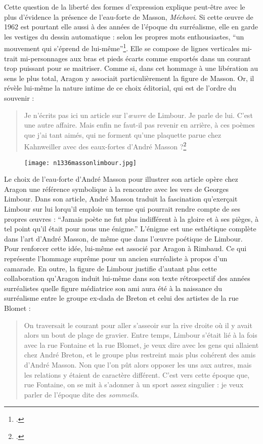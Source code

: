 	Cette question de la liberté des formes d’expression explique peut-être avec le plus d’évidence la présence de l’eau-forte de Masson, \emph{Méchovi}. Si cette \oe{}uvre de 1962 est pourtant elle aussi à des années de l’époque du surréalisme, elle en garde les vestiges du dessin automatique : selon les propres mots enthousiastes, \enquote{un mouvement qui s’éprend de lui-même}\footcite[p21]{rebelle}. Elle se compose de lignes verticales mi-trait mi-personnages aux bras et pieds écarts comme emportés dans un courant trop puissant pour se maitriser. Comme si, dans cet hommage à une libération au sens le plus total, Aragon y associait particulièrement la figure de Masson. Or, il révèle lui-même la nature intime de ce choix éditorial, qui est de l’ordre du souvenir :
\begin{quote}
Je n’écrits pas ici un article sur l’\emph{\oe{}uvre} de Limbour. Je parle de lui. C’est une autre affaire. Mais enfin ne faut-il pas revenir en arrière, à ces poèmes que j’ai tant aimés, qui ne forment qu’une plaquette parue chez Kahnweiller avec des eaux-fortes d’André Masson ?\footcite{journallimbour}\end{quote}

\begin{figure}[H]
   \centering
   \texttt{[image: n1336massonlimbour.jpg]}
	\caption{\cite{journallimbour}}\label{fig:Méchovi}
\end{figure}

	Le choix de l’eau-forte d’André Masson pour illustrer son article opère chez Aragon une référence symbolique à la rencontre avec les vers de Georges Limbour. Dans son article, André Masson traduit la fascination qu’exerçait Limbour sur lui lorqu'il emploie un terme qui pourrait rendre compte de ses propres œuvres : \enquote{Jamais poète ne fut plus indifférent à la gloire et à ses pièges, à tel point qu’il était pour nous une énigme.} L’énigme est une esthétique complète dans l’art d’André Masson, de même que dans l’\oe{}uvre poétique de Limbour. Pour renforcer cette idée, lui-même est associé par Aragon à Rimbaud. Ce qui représente l'hommage suprême pour un ancien surréaliste à propos d’un camarade. En outre, la figure de Limbour justifie d’autant plus cette collaboration qu’Aragon induit lui-même dans son texte rétrospectif des années surréalistes quelle figure médiatrice son ami aura été à la naissance du surréalisme entre le groupe ex-dada de Breton et celui des artistes de la rue Blomet : 

\begin{quote}
On traversait le courant pour aller s’asseoir sur la rive droite où il y avait alors un bout de plage de gravier. Entre temps, Limbour s’était lié à la fois avec la rue Fontaine et la rue Blomet, je veux dire avec les gens qui allaient chez André Breton, et le groupe plus restreint mais plus cohérent des amis d’André Masson. Non que l’on pût alors opposer les uns aux autres, mais les relations y étaient de caractère différent. C’est vers cette époque que, rue Fontaine, on se mit à s’adonner à un sport assez singulier : je veux parler de l’époque dite des \emph{sommeils}.	
\end{quote}


